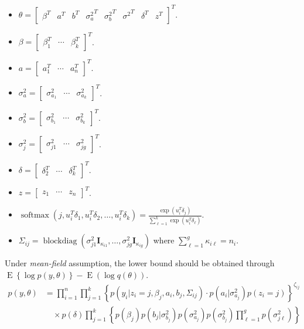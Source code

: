 \documentclass[11pt]{article}
\newcommand{\bs}{\boldsymbol}
\newcommand{\opn}{\operatorname}
\begin{document}
\begin{itemize}
  \item $\theta = \begin{bmatrix}\beta^{T} & a^{T} & b^{T} & {\sigma_{a}^{2}}^{T} & {\sigma_{b}^{2}}^{T} & {\sigma^{2}}^{T} & \delta^{T} & z^{T}   \end{bmatrix}^{T}$.
  \item $\beta = \begin{bmatrix} \beta_{1}^{T} & \cdots & \beta_{k}^{T}  \end{bmatrix}^{T}$.
  \item $a = \begin{bmatrix}a_{1}^{T} & \cdots & a_{n}^{T}  \end{bmatrix}^{T} $.
  \item $\sigma_{a}^{2}= \begin{bmatrix} \sigma_{a_{1}}^{2} & \cdots & \sigma_{a_{k}}^{2}  \end{bmatrix}^{T} $.
  \item $\sigma_{b}^{2} = \begin{bmatrix}\sigma_{b_{1}}^{2} & \cdots & \sigma_{b_{k}}^{2}  \end{bmatrix}^{T} $.
  \item $\sigma_{j}^{2} = \begin{bmatrix} \sigma_{j1}^{2} & \cdots & \sigma_{jg}^{2}   \end{bmatrix}^{T} $.
  \item $\delta = \begin{bmatrix} \delta_{2}^{T} & \cdots & \delta_{k}^{T}  \end{bmatrix}^{T} $.
  \item $z = \begin{bmatrix}z_{1} & \cdots & z_{n}  \end{bmatrix}^{T} $.
  \item $\opn{softmax}\left(j, u_{i}^{T}\delta_{1}, u_{i}^{T}\delta_{2}, \ldots, u_{i}^{T}\delta_{k} \right) = \frac{\exp \left(u_{i}^{T}\delta_{j} \right)}{\sum_{\ell=1}^{k} \exp\left(u_{i}^{T}\delta_{\ell} \right)}$.
  \item $\Sigma_{ij} = \opn{blockdiag}\left(\sigma_{j1}^{2}\bs{I}_{\kappa_{i1}}, \ldots , \sigma_{jg}^{2}\bs{I}_{\kappa_{ig}} \right)$ where $\sum_{\ell=1}^{g}\kappa_{i\ell} = n_{i} $.
\end{itemize}
Under \emph{mean-field} assumption, the lower bound should be obtained through $\opn{E}\left\{\log p(y, \theta) \right\}- \opn{E}\left(\log q(\theta) \right) $.
\begin{align*}
  p(y, \theta) &= \prod_{i=1}^{n}\prod_{j=1}^{k} \left\{p\left(y_{i}|z_{i}=j, \beta_{j}, a_{i}, b_{j}, \Sigma_{ij} \right) \cdot p\left(a_{i}| \sigma_{a_{j}}^{2} \right) p\left(z_{i}=j \right) \right\}^{\zeta_{ij}} \\
  & \quad \times p(\delta) \prod_{j=1}^{k}\left\{p(\beta_{j})p\left(b_{j}|\sigma_{b_{j}}^{2} \right) p\left(\sigma_{a_{j}}^{2} \right)p\left(\sigma_{b_{j}}^{2} \right) \prod_{\ell=1}^{g} p \left(\sigma_{j\ell}^{2} \right) \right\}
\end{align*}
\end{document}
